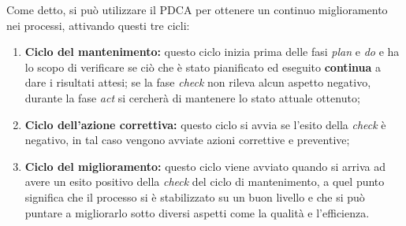 Come detto, si può utilizzare il PDCA per ottenere un continuo miglioramento nei processi, attivando questi tre cicli:
\begin{enumerate}
	\item{\bf Ciclo del mantenimento:} questo ciclo inizia prima delle fasi \emph{plan} e \emph{do} e ha lo scopo di verificare se ciò che è stato pianificato ed eseguito \textbf{continua} a dare i risultati attesi; se la fase \emph{check} non rileva alcun aspetto negativo, durante la fase \emph{act} si cercherà di mantenere lo stato attuale ottenuto;
	\item{\bf Ciclo dell'azione correttiva:} questo ciclo si avvia se l'esito della \emph{check} è negativo, in tal caso vengono avviate azioni correttive e preventive;
	\item{\bf Ciclo del miglioramento:} questo ciclo viene avviato quando si arriva ad avere un esito positivo della \emph{check} del ciclo di mantenimento, a quel punto significa che il processo si è stabilizzato su un buon livello e che si può puntare a migliorarlo sotto diversi aspetti come la qualità e l'efficienza.
\end{enumerate}
